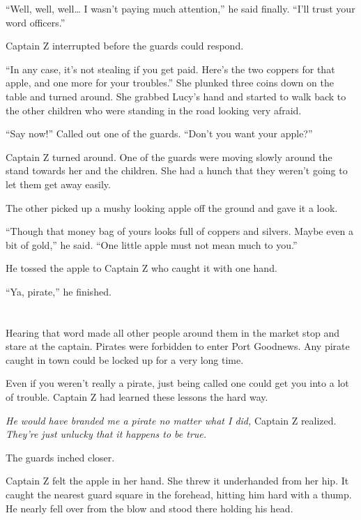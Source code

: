 \documentclass[12pt]{extbook}
\begin{document}
  \enquote{Well, well, well\ldots{} I wasn't paying much attention,} he
  said finally. \enquote{I'll trust your word officers.}
  
  Captain Z interrupted before the guards could respond.
  
  \enquote{In any case, it's not stealing if you get paid. Here's the two
  coppers for that apple, and one more for your troubles.} She plunked
  three coins down on the table and turned around. She grabbed Lucy's hand
  and started to walk back to the other children who were standing in the
  road looking very afraid.
  
  \enquote{Say now!} Called out one of the guards. \enquote{Don't you want
  your apple?}
  
  Captain Z turned around. One of the guards were moving slowly around the
  stand towards her and the children. She had a hunch that they weren't
  going to let them get away easily.
  
  The other picked up a mushy looking apple off the ground and gave it a
  look.
  
  \enquote{Though that money bag of yours looks full of coppers and
  silvers. Maybe even a bit of gold,} he said. \enquote{One little apple
  must not mean much to you.}
  
  He tossed the apple to Captain Z who caught it with one hand.
  
  \enquote{Ya, pirate,} he finished.
  
  \section{}\label{section-32}
  
  Hearing that word made all other people around them in the market stop
  and stare at the captain. Pirates were forbidden to enter Port Goodnews.
  Any pirate caught in town could be locked up for a very long time.
  
  Even if you weren't really a pirate, just being called one could get you
  into a lot of trouble. Captain Z had learned these lessons the hard way.
  
  \emph{He would have branded me a pirate no matter what I did,} Captain Z
  realized. \emph{They're just unlucky that it happens to be true.}
  
  The guards inched closer.
  
  Captain Z felt the apple in her hand. She threw it underhanded from her
  hip. It caught the nearest guard square in the forehead, hitting him
  hard with a thump. He nearly fell over from the blow and stood there
  holding his head.
  
\end{document}
